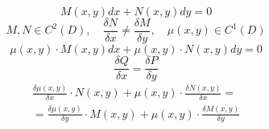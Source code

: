 \documentclass{report}
\theoremstyle{definition}
\begin{document}
\begin{equation}
    M(x,y)dx + N(x,y)dy = 0
\end{equation}
\begin{equation*}
    M,N \in C^2(D), \quad \frac{\delta N}{\delta x} \ne \frac{\delta M}{\delta y}, \quad \mu(x,y)\in C^1(D)
\end{equation*}
\begin{equation*}
    \mu(x,y)\cdot M(x,y)dx + \mu(x,y) \cdot N(x,y)dy = 0
\end{equation*}
\begin{equation*}
    \frac{\delta Q}{\delta x} = \frac{\delta P}{\delta y}
\end{equation*}
\begin{multline*}
    \frac{\delta \mu(x,y)}{\delta x} \cdot N(x,y) + \mu(x,y)\cdot \frac{\delta N(x,y)}{\delta x} = \\
    = \frac{\delta \mu(x,y)}{\delta y} \cdot M(x,y) + \mu(x,y) \cdot \frac{\delta M(x,y)}{\delta y}
\end{multline*}
\end{document}
